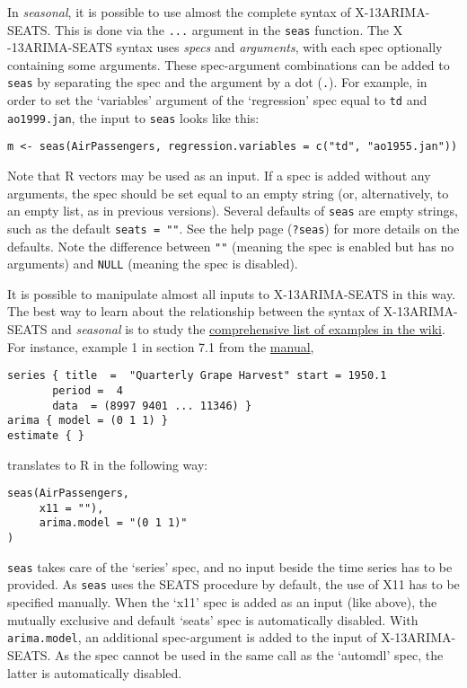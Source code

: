 In \emph{seasonal}, it is possible to use almost the complete syntax of
X-13ARIMA- SEATS. This is done via the \texttt{...} argument in the
\texttt{seas} function. The X -13ARIMA-SEATS syntax uses \emph{specs}
and \emph{arguments}, with each spec optionally containing some
arguments. These spec-argument combinations can be added to
\texttt{seas} by separating the spec and the argument by a dot
(\texttt{.}). For example, in order to set the `variables' argument of
the `regression' spec equal to \texttt{td} and \texttt{ao1999.jan}, the
input to \texttt{seas} looks like this:

\begin{verbatim}
m <- seas(AirPassengers, regression.variables = c("td", "ao1955.jan"))
\end{verbatim}

Note that R vectors may be used as an input. If a spec is added without
any arguments, the spec should be set equal to an empty string (or,
alternatively, to an empty list, as in previous versions). Several
defaults of \texttt{seas} are empty strings, such as the default
\texttt{seats\ =\ ""}. See the help page (\texttt{?seas}) for more
details on the defaults. Note the difference between \texttt{""}
(meaning the spec is enabled but has no arguments) and \texttt{NULL}
(meaning the spec is disabled).

It is possible to manipulate almost all inputs to X-13ARIMA-SEATS in
this way. The best way to learn about the relationship between the
syntax of X-13ARIMA-SEATS and \emph{seasonal} is to study the
\href{https://github.com/christophsax/seasonal/wiki/Examples-of-X-13ARIMA-SEATS-in-R}{comprehensive
list of examples in the wiki}. For instance, example 1 in section 7.1
from the \href{http://www.census.gov/ts/x13as/docX13ASHTML.pdf}{manual},

\begin{verbatim}
series { title  =  "Quarterly Grape Harvest" start = 1950.1
       period =  4
       data  = (8997 9401 ... 11346) }
arima { model = (0 1 1) }
estimate { }
\end{verbatim}

translates to R in the following way:

\begin{verbatim}
seas(AirPassengers,
     x11 = ""),
     arima.model = "(0 1 1)"
)
\end{verbatim}

\texttt{seas} takes care of the `series' spec, and no input beside the
time series has to be provided. As \texttt{seas} uses the SEATS
procedure by default, the use of X11 has to be specified manually. When
the `x11' spec is added as an input (like above), the mutually exclusive
and default `seats' spec is automatically disabled. With
\texttt{arima.model}, an additional spec-argument is added to the input
of X-13ARIMA-SEATS. As the spec cannot be used in the same call as the
`automdl' spec, the latter is automatically disabled.

